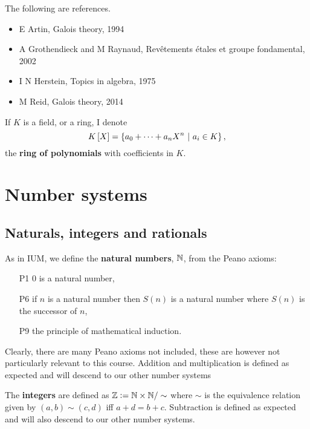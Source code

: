 
The following are references.
\begin{itemize}
\item E Artin, Galois theory, 1994
\item A Grothendieck and M Raynaud, Rev\^etements \'etales et groupe fondamental, 2002
\item I N Herstein, Topics in algebra, 1975
\item M Reid, Galois theory, 2014
\end{itemize}

\begin{notation*}
If $ K $ is a field, or a ring, I denote
$$ K\sbr{X} = \cbr{a_0 + \dots + a_nX^n \st a_i \in K}, $$
the \textbf{ring of polynomials} with coefficients in $ K $.
\end{notation*}

\section{Number systems}

\subsection{Naturals, integers and rationals}

\begin{definition}
    As in IUM, we define the \textbf{natural numbers}, $\mathbb{N}$, from the Peano axioms: \begin{enumerate}
        \item[P1] $0$ is a natural number,
        \item[P6] if $n$ is a natural number then $S(n)$ is a natural number where $S(n)$ is the successor of $n$,
        \item[P9] the principle of mathematical induction.
    \end{enumerate}
    Clearly, there are many Peano axioms not included, these are however not particularly relevant to this course. Addition and multiplication is defined as expected and will descend to our other number systems
\end{definition}

\begin{definition}[Integers]
    The \textbf{integers} are defined as $\mathbb{Z} := \mathbb{N}\times\mathbb{N}/\sim$ where $\sim$ is the equivalence relation given by $(a,b)\sim(c,d)$ iff $a+d = b+c$. Subtraction is defined as expected and will also descend to our other number systems.
\end{definition}

